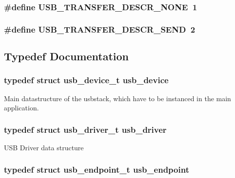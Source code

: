 \subsubsection{\setlength{\rightskip}{0pt plus 5cm}\#define USB\_\-TRANSFER\_\-DESCR\_\-NONE~1}\label{core_8h_0f49f908740eb57b66ac6fd6fa34f254}


\subsubsection{\setlength{\rightskip}{0pt plus 5cm}\#define USB\_\-TRANSFER\_\-DESCR\_\-SEND~2}\label{core_8h_15d88238c095718d6a84b0589f9cf361}




\subsection{Typedef Documentation}
\subsubsection{\setlength{\rightskip}{0pt plus 5cm}typedef struct {\bf usb\_\-device\_\-t} {\bf usb\_\-device}}\label{core_8h_012617ff18a07f414412b30b4eadc6ef}


Main datastructure of the usbstack, which have to be instanced in the main application. 
\subsubsection{\setlength{\rightskip}{0pt plus 5cm}typedef struct {\bf usb\_\-driver\_\-t} {\bf usb\_\-driver}}\label{core_8h_ff1f997f9dcedd3e85f4f98488881c16}


USB Driver data structure 
\subsubsection{\setlength{\rightskip}{0pt plus 5cm}typedef struct {\bf usb\_\-endpoint\_\-t} {\bf usb\_\-endpoint}}\label{core_8h_62c9b2ad7123c6b8d665c85e80ef95bb}


